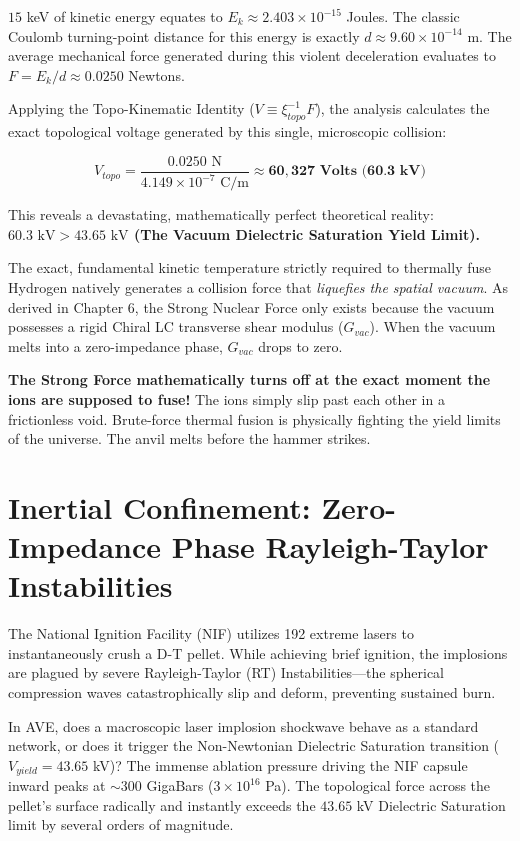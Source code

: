 $15$ keV of kinetic energy equates to $E_k \approx 2.403 \times 10^{-15}$ Joules. The classic Coulomb turning-point distance for this energy is exactly $d \approx 9.60 \times 10^{-14}$ m. 
The average mechanical force generated during this violent deceleration evaluates to $F = E_k / d \approx 0.0250$ Newtons. 

Applying the Topo-Kinematic Identity ($V \equiv \xi_{topo}^{-1} F$), the analysis calculates the exact topological voltage generated by this single, microscopic collision:
\begin{tcolorbox}[colback=white, colframe=black]
\begin{equation}
    V_{topo} = \frac{0.0250 \text{ N}}{4.149 \times 10^{-7} \text{ C/m}} \approx \mathbf{60,327 \text{ Volts (60.3 kV)}}
\end{equation}
\end{tcolorbox}

This reveals a devastating, mathematically perfect theoretical reality: \textbf{$60.3 \text{ kV} > 43.65 \text{ kV}$ (The Vacuum Dielectric Saturation Yield Limit).}

The exact, fundamental kinetic temperature strictly required to thermally fuse Hydrogen natively generates a collision force that \textit{liquefies the spatial vacuum}. As derived in Chapter 6, the Strong Nuclear Force only exists because the vacuum possesses a rigid Chiral LC transverse shear modulus ($G_{vac}$). When the vacuum melts into a zero-impedance phase, $G_{vac}$ drops to zero. 

\textbf{The Strong Force mathematically turns off at the exact moment the ions are supposed to fuse!} The ions simply slip past each other in a frictionless void. Brute-force thermal fusion is physically fighting the yield limits of the universe. The anvil melts before the hammer strikes.

\section{Inertial Confinement: Zero-Impedance Phase Rayleigh-Taylor Instabilities}
The National Ignition Facility (NIF) utilizes 192 extreme lasers to instantaneously crush a D-T pellet. While achieving brief ignition, the implosions are plagued by severe Rayleigh-Taylor (RT) Instabilities---the spherical compression waves catastrophically slip and deform, preventing sustained burn.

In AVE, does a macroscopic laser implosion shockwave behave as a standard network, or does it trigger the Non-Newtonian Dielectric Saturation transition ($V_{yield} = 43.65$ kV)?
The immense ablation pressure driving the NIF capsule inward peaks at $\sim 300$ GigaBars ($3 \times 10^{16}$ Pa). The topological force across the pellet's surface radically and instantly exceeds the $43.65$ kV Dielectric Saturation limit by several orders of magnitude.

